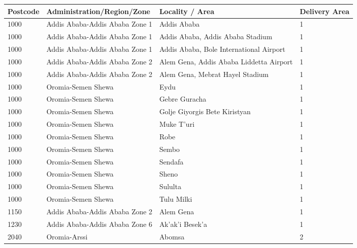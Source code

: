 \documentclass[12pt,a4paper,openbib,titlepage]{report}
\begin{document}
\thispagestyle{empty}
\begin{longtable}{|p{2cm}|p{6.5cm}|p{8cm}|p{1.5cm}|}
\hline 
\rule[-1ex]{0pt}{5.5ex} \textbf{Postcode} & \textbf{Administration/Region/Zone} & \textbf{Locality} / \textbf{Area} & \textbf{Delivery Area} \\ 
\hline 
\rule[-1ex]{0pt}{2.5ex} 1000 & Addis Ababa-Addis Ababa Zone 1 & Addis Ababa & 1 \\
\hline 
\rule[-1ex]{0pt}{2.5ex} 1000 & Addis Ababa-Addis Ababa Zone 1 & Addis Ababa, Addis Ababa Stadium & 1 \\ 
\hline 
\rule[-1ex]{0pt}{2.5ex} 1000 & Addis Ababa-Addis Ababa Zone 1 & Addis Ababa, Bole International Airport & 1 \\ 
\hline 
\rule[-1ex]{0pt}{2.5ex} 1000 & Addis Ababa-Addis Ababa Zone 2 & Alem Gena, Addis Ababa Liddetta Airport & 1 \\ 
\hline 
\rule[-1ex]{0pt}{2.5ex} 1000 & Addis Ababa-Addis Ababa Zone 2 & Alem Gena, Mebrat Hayel Stadium & 1 \\
\hline 
\rule[-1ex]{0pt}{2.5ex} 1000 & Oromia-Semen Shewa & Eydu & 1 \\ 
\hline 
\rule[-1ex]{0pt}{2.5ex} 1000 & Oromia-Semen Shewa & Gebre Guracha & 1 \\ 
\hline 
\rule[-1ex]{0pt}{2.5ex} 1000 & Oromia-Semen Shewa & Golje Giyorgis Bete Kiristyan & 1 \\ 
\hline 
\rule[-1ex]{0pt}{2.5ex} 1000 & Oromia-Semen Shewa & Muke T'uri & 1 \\ 
\hline 
\rule[-1ex]{0pt}{2.5ex} 1000 & Oromia-Semen Shewa & Robe & 1 \\ 
\hline 
\rule[-1ex]{0pt}{2.5ex} 1000 & Oromia-Semen Shewa & Sembo & 1 \\ 
\hline 
\rule[-1ex]{0pt}{2.5ex} 1000 & Oromia-Semen Shewa & Sendafa & 1 \\ 
\hline 
\rule[-1ex]{0pt}{2.5ex} 1000 & Oromia-Semen Shewa & Sheno & 1 \\ 
\hline 
\rule[-1ex]{0pt}{2.5ex} 1000 & Oromia-Semen Shewa & Sululta & 1 \\ 
\hline 
\rule[-1ex]{0pt}{2.5ex} 1000 & Oromia-Semen Shewa & Tulu Milki & 1 \\ 
\hline 
\rule[-1ex]{0pt}{2.5ex} 1150 & Addis Ababa-Addis Ababa Zone 2 & Alem Gena & 1 \\ 
\hline 
\rule[-1ex]{0pt}{2.5ex} 1230 & Addis Ababa-Addis Ababa Zone 6 & Ak'ak'i Besek'a & 1 \\ 
\hline 
\rule[-1ex]{0pt}{2.5ex} 2040 & Oromia-Arssi & Abomsa & 2 \\ 

\end{longtable}
\end{document}
